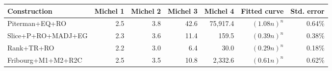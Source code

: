 \begin{tabular}{lrrrrrr}
  \hline
Construction & Michel 1 & Michel 2 & Michel 3 & Michel 4 & Fitted curve & Std. error \\ 
  \hline
Piterman+EQ+RO & 2.5 & 3.8 & 42.6 & 75,917.4 & $(1.08n)^n$ & 0.64\% \\ 
  Slice+P+RO+MADJ+EG & 2.3 & 3.6 & 11.4 & 159.5 & $(0.39n)^n$ & 0.38\% \\ 
  Rank+TR+RO & 2.2 & 3.0 & 6.4 & 30.0 & $(0.29n)^n$ & 0.18\% \\ 
  Fribourg+M1+M2+R2C & 2.5 & 3.5 & 10.8 & 2,332.6 & $(0.61n)^n$ & 0.62\% \\ 
   \hline
\end{tabular}
